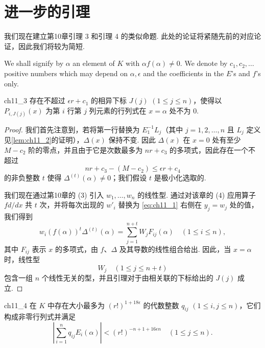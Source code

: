 \section{进一步的引理}\label{sec:ch11_3}

我们现在建立第10章引理 3 和引理 4 的类似命题. 此处的论证将紧随先前的对应论证，因此我们将较为简短.

We shall signify by $\alpha$ an element of $K$ with $\alpha f(\alpha) \neq 0$. We denote by $c_1, c_2, \ldots$ positive numbers which may depend on $\alpha, \epsilon$ and the coefficients in the $E$'s and $f$'s only.

\begin{mylemma}{}{ch11_3}
存在不超过 $\epsilon r + c_1$ 的相异下标 $J(j)$ $(1 \le j \le n)$，使得以 $P_{i, J(j)}(x)$ 为第 $i$ 行第 $j$ 列元素的行列式在 $x = \alpha$ 处不为 0.
\end{mylemma}

\begin{proof}
我们首先注意到，若将第一行替换为 $E_1^{-1}L_j$（其中 $j=1,2,\ldots,n$ 且 $L_j$ 定义见\autoref{lem:ch11_2}的证明），$\Delta(x)$ 保持不变. 因此 $\Delta(x)$ 在 $x=0$ 处有至少 $M-c_2$ 阶的零点，并且由于它是次数最多为 $nr+c_3$ 的多项式，因此存在一个不超过
\[nr + c_3 - (M - c_2) \leqslant \epsilon r + c_4\]
的非负整数 $t$ 使得 $\Delta^{(t)}(\alpha) \neq 0$；我们假设 $t$ 是极小化选取的.

我们现在通过第10章的 (3) 引入 $w_1, \ldots, w_n$ 的线性型. 通过对该章的 (4) 应用算子 $f d/dx$ 共 $t$ 次，并将每次出现的 $w'_i$ 替换为 \eqref{eq:ch11_1} 右侧在 $y_j = w_j$ 处的值，我们得到
\[w_i(f(\alpha))^t \Delta^{(t)}(\alpha) = \sum_{j=1}^{n+t} W_j F_{ij}(\alpha) \quad (1 \leq i \leq n),\]
其中 $F_{ij}$ 表示 $x$ 的多项式，由 $f$、$\Delta$ 及其导数的线性组合给出. 因此，当 $x = \alpha$ 时，线性型
\[W_j \quad (1 \leqslant j \leqslant n+t)\]
包含一组 $n$ 个线性无关的型，并且引理对于由相关联的下标给出的 $J(j)$ 成立.
\end{proof}

\begin{mylemma}{}{ch11_4}
在 $K$ 中存在大小最多为 $(r!)^{1+18\epsilon}$ 的代数整数 $q_{ij}$ $(1 \le i, j \le n)$，它们构成非零行列式并满足
\[\left|\sum_{i=1}^{n} q_{ij} E_i(\alpha)\right| < (r!)^{-n+1+16\epsilon n} \quad (1 \leq j \leq n). \tag{5}\label{eq:ch11_5}\]
\end{mylemma}

